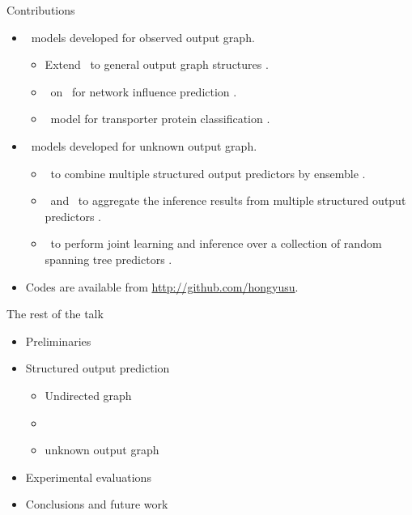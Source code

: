 \documentclass[first=dgreen,second=purple,logo=red]{aaltoslides}
\begin{document}
%
\begin{frame}{Contributions}
	\begin{itemize}\footnotesize
		\item \sop\ models developed for observed output graph.
		\begin{itemize}\footnotesize
			\item Extend \mmcrf\ to general output graph structures \cite{su10structured}.
			\item \spin\ on \daggraph\ for network influence prediction \cite{su14structured}.
			\item \sop\ model for transporter protein classification \cite{su15transporter}.
		\end{itemize}
		\item \sop\ models developed for unknown output graph.
		\begin{itemize}\footnotesize
			\item \mve\ to combine multiple structured output predictors by ensemble \cite{su11mutitask}.
			\item \amm\ and \mam\ to aggregate the inference results from multiple structured output predictors \cite{su2013multilabelacml,su15multilabel}.
			\item \rta\ to perform joint learning and inference over a collection of random spanning tree predictors \cite{su14multilabelnips}.
		\end{itemize}
		\item Codes are available from \href{https://github.com/hongyusu?tab=repositories}{http://github.com/hongyusu}.
	\end{itemize}
\end{frame}


%
\begin{frame}{The rest of the talk}
	\begin{itemize}\footnotesize
		\item Preliminaries
		\item Structured output prediction
		\begin{itemize}\footnotesize
			\item Undirected graph
			\item \daggraph
			\item unknown output graph
		\end{itemize}
		\item Experimental evaluations
		\item Conclusions and future work
	\end{itemize}
\end{frame}
\end{document}

